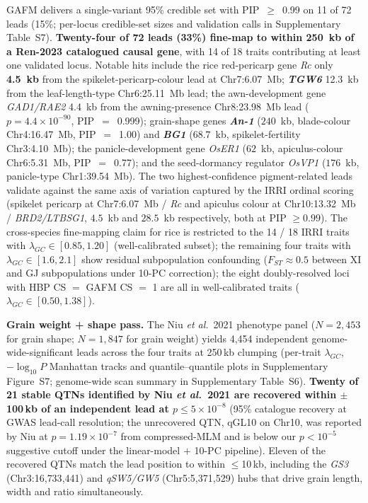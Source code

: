 GAFM delivers a single-variant 95\% credible set with PIP~$\geq$~0.99
on 11 of 72 leads (15\%; per-locus credible-set sizes and validation
calls in Supplementary Table~S7). \textbf{Twenty-four of 72 leads (33\%)
fine-map to within 250~kb of a Ren-2023 catalogued causal gene}, with
14 of 18 traits contributing at least one validated locus. Notable
hits include the rice red-pericarp gene \emph{Rc} only \textbf{4.5~kb}
from the spikelet-pericarp-colour lead at Chr7:6.07~Mb;
\textbf{\emph{TGW6}} 12.3~kb from the leaf-length-type Chr6:25.11~Mb
lead; the awn-development gene \emph{GAD1/RAE2} 4.4~kb from the
awning-presence Chr8:23.98~Mb lead ($p=4.4\times10^{-90}$,
PIP~$=$~0.999); grain-shape genes \textbf{\emph{An-1}}
($240$~kb, blade-colour Chr4:16.47~Mb, PIP~$=$~1.00) and
\textbf{\emph{BG1}} ($68.7$~kb, spikelet-fertility Chr3:4.10~Mb);
the panicle-development gene \emph{OsER1} ($62$~kb,
apiculus-colour Chr6:5.31~Mb, PIP~$=$~0.77); and the seed-dormancy
regulator \emph{OsVP1} ($176$~kb, panicle-type Chr1:39.54~Mb).
The two highest-confidence pigment-related leads validate against
the same axis of variation captured by the IRRI ordinal scoring
(spikelet pericarp at Chr7:6.07~Mb / \emph{Rc} and apiculus colour
at Chr10:13.32~Mb / \emph{BRD2/LTBSG1}, $4.5$~kb and $28.5$~kb
respectively, both at PIP $\geq 0.99$). The cross-species
fine-mapping claim for rice is restricted to the 14 / 18 IRRI
traits with $\lambda_{GC} \in [0.85, 1.20]$ (well-calibrated
subset); the remaining four traits with $\lambda_{GC} \in
[1.6, 2.1]$ show residual subpopulation
confounding ($F_{ST} \approx 0.5$ between XI and GJ subpopulations
under 10-PC correction); the eight doubly-resolved loci with
HBP CS $=$ GAFM CS $=$ 1 are all in well-calibrated traits
($\lambda_{GC} \in [0.50, 1.38]$).

\textbf{Grain weight + shape pass.}
The Niu \emph{et al.}\ 2021 phenotype panel ($N{=}2{,}453$ for grain
shape; $N{=}1{,}847$ for grain weight) yields 4{,}454 independent
genome-wide-significant leads across the four traits at 250\,kb
clumping (per-trait $\lambda_{GC}$, $-\log_{10}\!P$ Manhattan tracks
and quantile--quantile plots in Supplementary Figure~S7;
genome-wide scan summary in Supplementary Table~S6).
\textbf{Twenty of 21 stable QTNs identified by Niu \emph{et al.}\
2021 are recovered within $\pm$100\,kb of an independent lead at
$p \leq 5\times10^{-8}$} (95\% catalogue
recovery at GWAS lead-call resolution; the unrecovered QTN, qGL10
on Chr10, was reported by Niu at $p{=}1.19\times10^{-7}$ from
compressed-MLM and is below our $p{<}10^{-5}$ suggestive cutoff
under the linear-model $+$ 10-PC pipeline).
Eleven of the recovered QTNs match the lead position
to within $\leq$10\,kb, including the \emph{GS3}
(Chr3:16{,}733{,}441) and \emph{qSW5/GW5} (Chr5:5{,}371{,}529)
hubs that drive grain length, width and ratio simultaneously.

